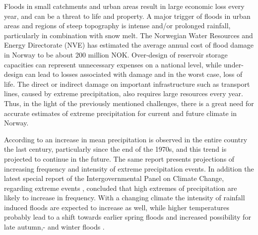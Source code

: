 \documentclass[12pt,a4paper,english]{article}
\begin{document}
Floods in small catchments and urban areas result in large economic loss every year, and can be a threat to life and property. A major trigger of floods in urban areas and regions of steep topography is intense and/or prolonged rainfall, particularly in combination with snow melt. The Norwegian Water Resources and Energy Directorate (NVE) has estimated the average annual cost of flood damage in Norway to be about 200 million NOK. Over-design of reservoir storage capacities can represent unnecessary expenses on a national level, while under-design can lead to losses associated with damage and in the worst case, loss of life. The direct or indirect damage on important infrastructure such as transport lines, caused by extreme precipitation, also requires large resources every year. Thus, in the light of the previously mentioned challenges, there is a great need for accurate estimates of extreme precipitation for current and future climate in Norway.

According to \cite{HanssenBaueretal2009} an increase in mean precipitation is observed in the entire country the last century, particularly since the end of the 1970s, and this trend is projected to continue in the future. The same report presents projections of increasing frequency and intensity of extreme precipitation events. In addition the latest special report of the Intergovernmental Panel on Climate Change, regarding extreme events \citep{SREX2012}, concluded that high extremes of precipitation are likely to increase in frequency. With a changing climate the intensity of rainfall induced floods are expected to increase as well, while higher temperatures probably lead to a shift towards earlier spring floods and increased possibility for late autumn,- and winter floods \citep{Wilsonetal2010, HanssenBaueretal2009, Hisdaletal2006}.
\end{document}
